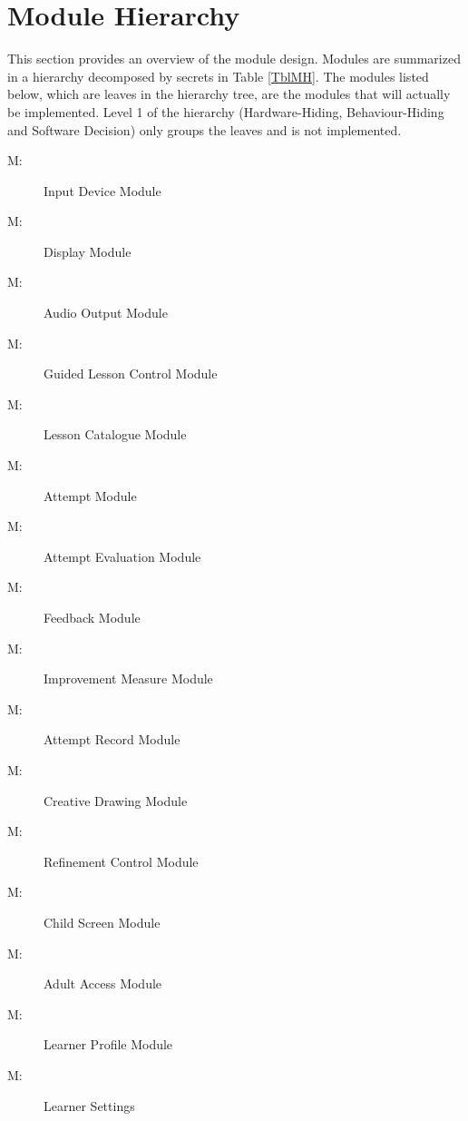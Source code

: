 \documentclass[12pt, titlepage]{article}
\newcounter{mnum}
\newcommand{\mthemnum}{M\themnum}
\begin{document}
\section{Module Hierarchy} \label{SecMH}

This section provides an overview of the module design. Modules are summarized
in a hierarchy decomposed by secrets in Table \ref{TblMH}. The modules listed
below, which are leaves in the hierarchy tree, are the modules that will
actually be implemented. Level 1 of the hierarchy (Hardware-Hiding,
Behaviour-Hiding and Software Decision) only groups the leaves and is not
implemented.

\begin{description}
\item [ \mthemnum \label{mInputDevice}:] Input Device
  Module
\item [ \mthemnum \label{mDisplay}:] Display Module
\item [ \mthemnum \label{mAudio}:] Audio Output Module
\item [ \mthemnum \label{mLessonControl}:] Guided Lesson
  Control Module
\item [ \mthemnum \label{mCatalogue}:] Lesson Catalogue
  Module
\item [ \mthemnum \label{mAttempt}:] Attempt Module
\item [ \mthemnum \label{mEvaluation}:] Attempt Evaluation
  Module
\item [ \mthemnum \label{mFeedback}:] Feedback Module
\item [ \mthemnum \label{mImprovement}:] Improvement
  Measure Module
\item [ \mthemnum \label{mRecord}:] Attempt Record Module
\item [ \mthemnum \label{mCreative}:] Creative Drawing
  Module
\item [ \mthemnum \label{mRefineControl}:] Refinement
  Control Module
\item [ \mthemnum \label{mChildScreen}:] Child Screen
  Module
\item [ \mthemnum \label{mAccess}:] Adult Access Module
\item [ \mthemnum \label{mProfile}:] Learner Profile Module
\item [ \mthemnum \label{mSettings}:] Learner Settings

\end{description}
\end{document}
